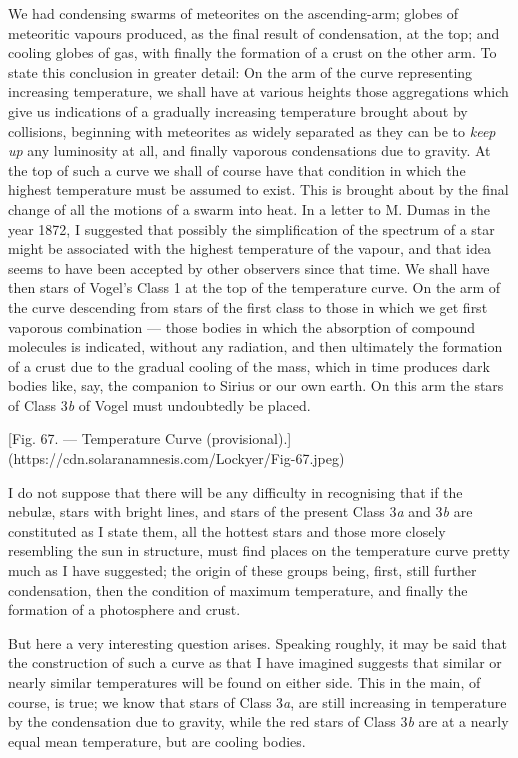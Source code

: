 \documentclass[a4paper, 12pt, oneside, polutonikogreek, english]{article}
\begin{document}
We had condensing swarms of meteorites on the ascending-arm; globes of meteoritic vapours produced, as the final result of condensation, at the top; and cooling globes of gas, with finally the formation of a crust on the other arm. To state this conclusion in greater detail: On the arm of the curve representing increasing temperature, we shall have at various heights those aggregations which give us indications of a gradually increasing temperature brought about by collisions, beginning with meteorites as widely separated as they can be to \emph{keep up} any luminosity at all, and finally vaporous condensations due to gravity. At the top of such a curve we shall of course have that condition in which the highest temperature must be assumed to exist. This is brought about by the final change of all the motions of a swarm into heat. In a letter to M. Dumas in the year 1872, I suggested that possibly the simplification of the spectrum of a star might be associated with the highest temperature of the vapour, and that idea seems to have been accepted by other observers since that time. We shall have then stars of Vogel's Class 1 at the top of the temperature curve. On the arm of the curve descending from stars of the first class to those in which we get first vaporous combination --- those bodies in which the absorption of compound molecules is indicated, without any radiation, and then ultimately the formation of a crust due to the gradual cooling of the mass, which in time produces dark bodies like, say, the companion to Sirius or our own earth. On this arm the stars of Class 3\emph{b} of Vogel must undoubtedly be placed.

[Fig. 67. --- Temperature Curve (provisional).](https://cdn.solaranamnesis.com/Lockyer/Fig-67.jpeg)

I do not suppose that there will be any difficulty in recognising that if the nebulæ, stars with bright lines, and stars of the present Class 3\emph{a} and 3\emph{b} are constituted as I state them, all the hottest stars and those more closely resembling the sun in structure, must find places on the temperature curve pretty much as I have suggested; the origin of these groups being, first, still further condensation, then the condition of maximum temperature, and finally the formation of a photosphere and crust.

But here a very interesting question arises. Speaking roughly, it may be said that the construction of such a curve as that I have imagined suggests that similar or nearly similar temperatures will be found on either side. This in the main, of course, is true; we know that stars of Class 3\emph{a}, are still increasing in temperature by the condensation due to gravity, while the red stars of Class 3\emph{b} are at a nearly equal mean temperature, but are cooling bodies.
\end{document}
